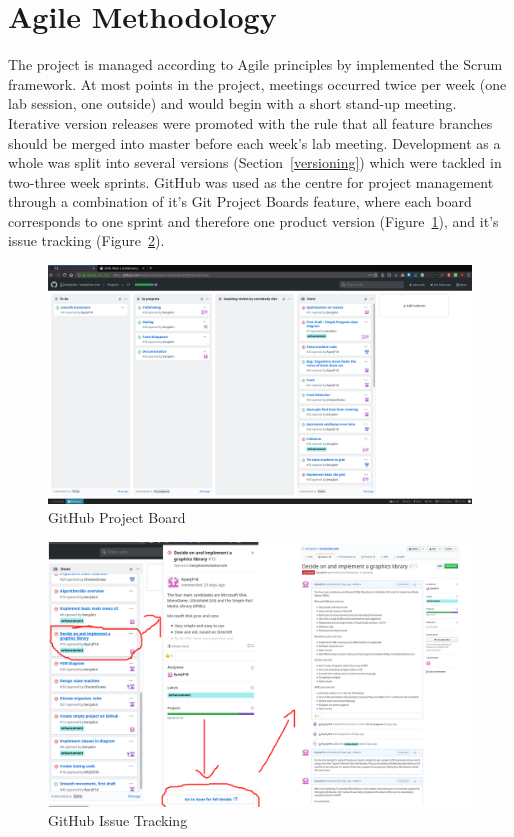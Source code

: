 \documentclass[a4paper, oneside, 11pt]{report}
\begin{document}
\section{Agile Methodology}\label{projectmanagement}
The project is managed according to Agile principles by implemented the Scrum framework. At most points in the project, meetings occurred twice per week (one lab session, one outside) and would begin with a short stand-up meeting. Iterative version releases were promoted with the rule that all feature branches should be merged into master before each week's lab meeting. Development as a whole was split into several versions (Section~\ref{versioning}) which were tackled in two-three week sprints. GitHub was used as the centre for project management through a combination of it's Git Project Boards feature, where each board corresponds to one sprint and therefore one product version (Figure~\ref{gitboard}), and it's issue tracking (Figure~\ref{gitissue}). 

\begin{figure}[H]
	\caption{GitHub Project Board}\label{gitboard}
	\centering
	\includegraphics[width=1\textwidth]{gitproj}
\end{figure}

\begin{figure}[H]
	\caption{GitHub Issue Tracking}\label{gitissue}
	\centering
	\includegraphics[width=1\textwidth]{gitissuetrack}
\end{figure}
\end{document}
